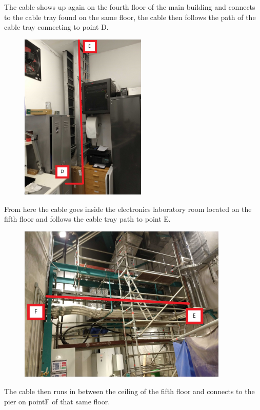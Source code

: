   The cable shows up again on the fourth floor of the main building and connects to the cable tray found on the same floor, the cable then follows the path of the cable tray connecting to point D.

  \begin{figure}
    \centering
  \includegraphics[width=6cm]{images/17.jpg}
  \label{fig:jlsimon}
  \end{figure}

  \newpage
  From here the cable goes inside the electronics laboratory room located on the fifth floor and follows the cable tray path to point E.

  \begin{figure}
  \centering
  \includegraphics[width=10cm]{images/18.jpg}
  \label{fig:jlsimon}
  \end{figure}

  The cable then runs in between the ceiling of the fifth floor and connects to the pier on pointF of that same floor.

